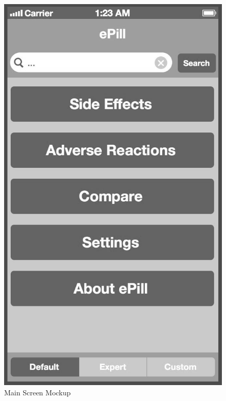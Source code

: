 \begin{figure}[!ptbh]
    \begin{minipage}[b]{0.45\linewidth}
        \centering
        \includegraphics[width=0.8025\linewidth]{figures/Screen_1_bw.jpg}
        \caption[Main Screen Mockup]{Main Screen Mockup}
        \label{fig:Mockup}
    \end{minipage}
    \hspace{0.5cm}
    \begin{minipage}[b]{0.45\linewidth}
        \centering

\end{minipage}
\end{figure}
